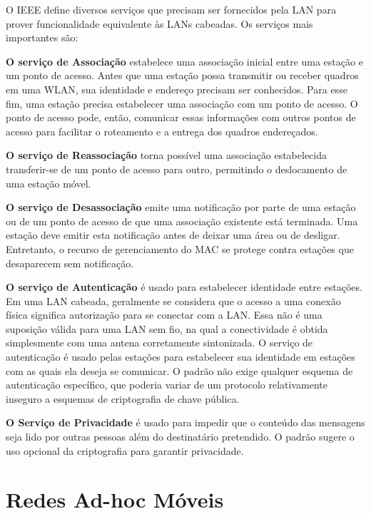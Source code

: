 \documentclass[
12pt,				%
openright,			%
oneside,			%
a4paper,			%
brazil,				%
]{abntex2}
\begin{document}
	\par O IEEE define diversos serviços que precisam ser fornecidos pela LAN para prover funcionalidade equivalente às LANs cabeadas. Os serviços mais importantes são:
	
	\par \textbf{O serviço de Associação} estabelece uma associação inicial entre uma estação e um ponto de acesso. Antes que uma estação possa transmitir ou receber quadros em uma WLAN, sua identidade e endereço precisam ser conhecidos. Para esse fim, uma estação precisa estabelecer uma associação com um ponto de acesso. O ponto de acesso pode, então, comunicar essas informações com outros pontos de acesso para facilitar o roteamento e a entrega dos quadros endereçados.
	
	\par \textbf{O serviço de Reassociação} torna possível uma associação estabelecida transferir-se de um ponto de acesso para outro, permitindo o deslocamento de uma estação móvel.
	
	\par \textbf{O serviço de Desassociação} emite uma notificação por parte de uma estação ou de um ponto de acesso de que uma associação existente está terminada. Uma estação deve emitir esta notificação antes de deixar uma área ou de desligar. Entretanto, o recurso de gerenciamento do MAC se protege contra estações que desaparecem sem notificação.
	
	\par \textbf{O serviço de Autenticação} é usado para estabelecer identidade entre estações. Em uma LAN cabeada, geralmente se considera que o acesso a uma conexão física significa autorização para se conectar com a LAN. Essa não é uma suposição válida para uma LAN sem fio, na qual a conectividade é obtida simplesmente com uma antena corretamente sintonizada. O serviço de autenticação é usado pelas estações para estabelecer sua identidade em estações com as quais ela deseja se comunicar. O padrão não exige qualquer esquema de autenticação específico, que poderia variar de um protocolo relativamente inseguro a esquemas de criptografia de chave pública.
	
	\par \textbf{O Serviço de Privacidade} é usado para impedir que o conteúdo das mensagens seja lido por outras pessoas além do destinatário pretendido. O padrão sugere o uso opcional da criptografia para garantir privacidade.		
	
	\section{Redes Ad-hoc Móveis}
	
\end{document}
